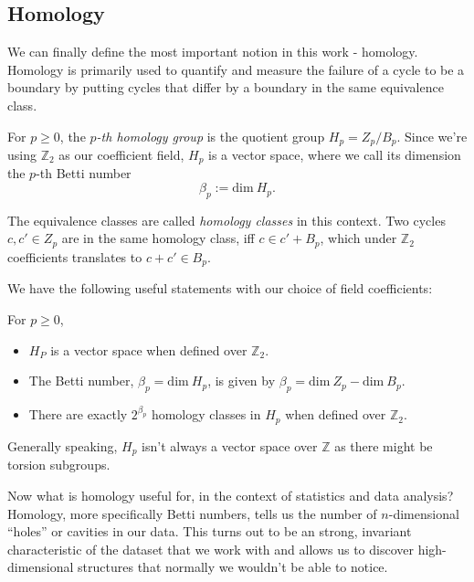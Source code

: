 \subsection{Homology}

We can finally define the most important notion in this work - homology. Homology is primarily used to quantify and measure the failure of a cycle to be a boundary by putting cycles that differ by a boundary in the same equivalence class.

\begin{definition}
  For $p \geq 0$, the \textit{$p$-th homology group} is the quotient group $H_{p} = Z_{p} / B_{p}$. Since we're using $\mathbb{Z}_{2}$ as our coefficient field, $H_{p}$ is a vector space, where we call its dimension the $p$-th Betti number
  \begin{equation*}
    \beta_{p} := \text{dim} \: H_{p}.
  \end{equation*}
\end{definition}

The equivalence classes are called \textit{homology classes} in this context. Two cycles $c, c' \in Z_{p}$ are in the same homology class, iff $c \in c' + B_{p}$, which under $\mathbb{Z}_{2}$ coefficients translates to $c + c' \in B_{p}$.

We have the following useful statements with our choice of field coefficients:

\begin{theorem}
For $p \geq 0$,
  \begin{itemize}
    \item $H_{P}$ is a vector space when defined over $\mathbb{Z}_{2}$.
    \item The Betti number, $\beta_{p} = \text{dim}\:H_{p}$, is given by $\beta_{p} = \text{dim}\:Z_{p} - \text{dim}\:B_{p}$.
    \item There are exactly $2^{\beta_{p}}$ homology classes in $H_{p}$ when defined over $\mathbb{Z}_{2}$.
  \end{itemize}
\end{theorem}

Generally speaking, $H_{p}$ isn't always a vector space over $\mathbb{Z}$ as there might be torsion subgroups.

Now what is homology useful for, in the context of statistics and data analysis? Homology, more specifically Betti numbers, tells us the number of $n$-dimensional ``holes'' or cavities in our data. This turns out to be an strong, invariant characteristic of the dataset that we work with and allows us to discover high-dimensional structures that normally we wouldn't be able to notice.
